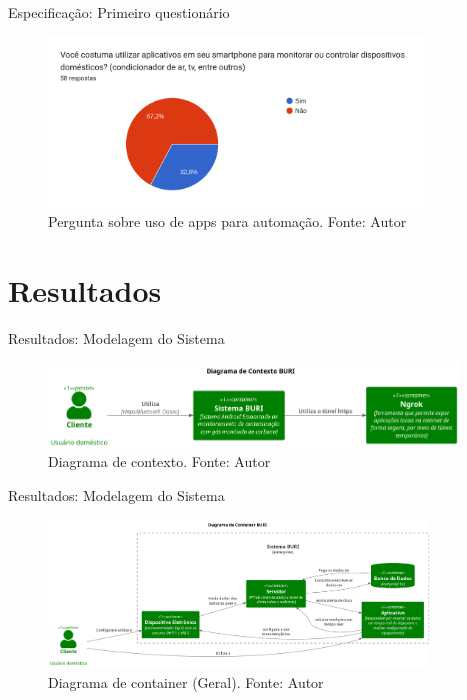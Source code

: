 \documentclass[12pt]{beamer}
\begin{document}
    \begin{frame}{Especificação: Primeiro questionário}        
        \begin{figure}[ht]
            \centering
            \includegraphics[width=0.89\textwidth]{./img/questionario-experiencia-config.png}
            \caption{Pergunta sobre uso de apps para automação. Fonte: Autor}\label{fig:configAut}
        \end{figure}
    \end{frame}

    \section{Resultados}

    \begin{frame}{Resultados: Modelagem do Sistema}
        \begin{figure}[ht]
            \centering
            \includegraphics[width=0.97\textwidth]{img/context-diagram.png}
            \caption{Diagrama de contexto. Fonte: Autor}\label{fig:dtcontext}
        \end{figure}
    \end{frame}

    \begin{frame}{Resultados: Modelagem do Sistema}
        \begin{figure}[ht]
            \centering
            \includegraphics[width=0.90\textwidth]{img/conteiner-diagram.png}
            \caption{Diagrama de container (Geral). Fonte: Autor}\label{fig:dtGeral}
        \end{figure}
    \end{frame}
\end{document}
